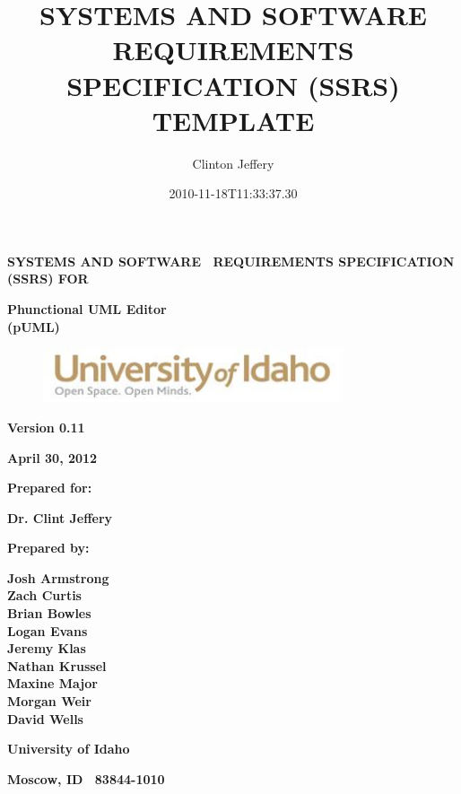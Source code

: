 \documentclass[twoside,letterpaper]{article}
\title{SYSTEMS AND SOFTWARE REQUIREMENTS SPECIFICATION (SSRS) TEMPLATE}
\author{Clinton Jeffery}
\date{2010-11-18T11:33:37.30}
\begin{document}
\clearpage
{\centering\bfseries
SYSTEMS AND SOFTWARE \ REQUIREMENTS SPECIFICATION (SSRS) FOR
\par}


\bigskip

{\centering\bfseries
Phunctional UML Editor
\\(pUML)
\par}


\bigskip


\bigskip


\bigskip

\begin{figure}
\centering
\includegraphics[width=3.5in]{uidahologo.jpg}
\end{figure}

\bigskip


\bigskip

{\centering\bfseries
Version 0.11
\par}

{\centering\bfseries
April 30, 2012
\par}


\bigskip


\bigskip

{\centering\bfseries
Prepared for:
\par}
{\centering\bfseries
Dr. Clint Jeffery
\par}

\bigskip


\bigskip

{\centering\bfseries
Prepared by:
\par}

{\centering\bfseries
Josh Armstrong
\\Zach Curtis
\\Brian Bowles
\\Logan Evans
\\Jeremy Klas
\\Nathan Krussel
\\Maxine Major
\\Morgan Weir
\\David Wells
\par}

{\centering\bfseries
University of Idaho
\par}

{\centering\bfseries
Moscow, ID \ 83844-1010
\par}
\end{document}
